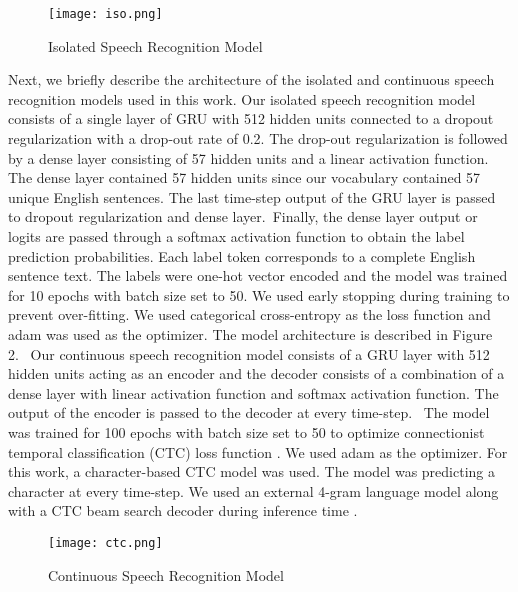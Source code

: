 \documentclass[letterpaper, 10 pt, conference]{ieeeconf}  %
\begin{document}
\begin{figure}[h]
\begin{center}
\texttt{[image: iso.png]}
\caption{Isolated Speech Recognition Model} 
\label{1vsall}
\end{center}
\end{figure}

Next, we briefly describe the architecture of the isolated and continuous speech recognition models used in this work. Our isolated speech recognition model consists of a single layer of GRU with 512 hidden units connected to a dropout regularization \cite{srivastava2014dropout} with a drop-out rate of 0.2. The drop-out regularization is followed by a dense layer consisting of 57 hidden units and a linear activation function. The dense layer contained 57 hidden units since our vocabulary contained 57 unique English sentences. The last time-step output of the GRU layer is passed to dropout regularization and dense layer. Finally, the dense layer output or logits are passed through a softmax activation function to obtain the label prediction probabilities. Each label token corresponds to a complete English sentence text. The labels were one-hot vector encoded and the model was trained for 10 epochs with batch size set to 50. We used early stopping during training to prevent over-fitting. We used categorical cross-entropy as the loss function and adam was used as the optimizer. The model architecture is described in Figure 2. 
Our continuous speech recognition model consists of a GRU layer with 512 hidden units acting as an encoder and the decoder consists of a combination of a dense layer with linear activation function and softmax activation function. The output of the encoder is passed to the decoder at every time-step.  The model was trained for 100 epochs with batch size set to 50 to optimize connectionist temporal classification (CTC) loss function \cite{graves2006connectionist,graves2014towards}. We used adam as the optimizer. For this work, a character-based CTC model was used. The model was predicting a character at every time-step. We used an external 4-gram language model along with a CTC beam search decoder during inference time \cite{toshniwal2018comparison}. 

\begin{figure}[h]
\begin{center}
\texttt{[image: ctc.png]}
\caption{Continuous Speech Recognition Model} 
\label{1vsall}
\end{center}
\end{figure}
\end{document}
